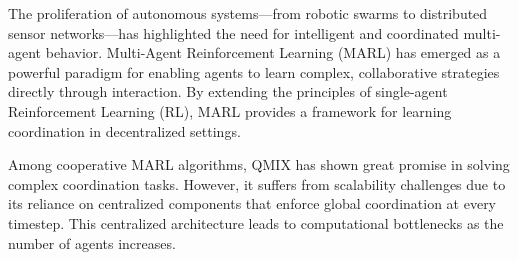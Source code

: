 \documentclass[../Main.tex]{subfiles}
\begin{document}


The proliferation of autonomous systems—from robotic swarms to distributed sensor networks—has highlighted the need for intelligent and coordinated multi-agent behavior. Multi-Agent Reinforcement Learning (MARL) has emerged as a powerful paradigm for enabling agents to learn complex, collaborative strategies directly through interaction. By extending the principles of single-agent Reinforcement Learning (RL), MARL provides a framework for learning coordination in decentralized settings.

Among cooperative MARL algorithms, QMIX has shown great promise in solving complex coordination tasks. However, it suffers from scalability challenges due to its reliance on centralized components that enforce global coordination at every timestep. This centralized architecture leads to computational bottlenecks as the number of agents increases.
\end{document}
